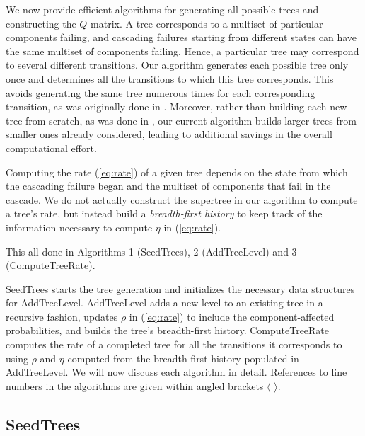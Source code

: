 \documentclass[12pt]{article}
\def\myxout{\bgroup \markoverwith{\textcolor{red}{\hbox to.35em{\hss/\hss}}}\ULon}
\newcommand{\deleted}[1]{}
\newcommand{\changed}[1]{#1}
\newcommand{\changed}[1]{\textcolor{red}{#1}}
\newcommand{\deleted}[1]{{\myxout{#1}}}
\newcommand{\varName}[1]{\textrm{\it#1}}
\newcommand{\citeLine}[1]{$\langle \, #1 \, \rangle$}
\begin{document}
We now provide efficient algorithms for generating all possible trees and constructing the $Q$-matrix. A tree corresponds to a multiset of particular components failing, and cascading failures starting from different states can have the same multiset of components failing. Hence, a particular tree may correspond to several different transitions. Our algorithm generates each possible tree only once and determines all the transitions to which this tree corresponds. This avoids generating the same tree numerous times for each corresponding transition, as was originally done in \cite{ING:2009}. Moreover, rather than building each new tree from scratch, as was done in \cite{ING:2009}, our current algorithm builds larger trees from smaller ones already considered, leading to additional savings in the overall computational effort.

Computing the rate 
\changed{(\ref{eq:rate})}
of a given tree depends on the state from which the cascading failure began and the multiset of components that fail in the cascade. We do not actually construct the supertree in our algorithm to compute a tree's rate, but instead build a \varName{breadth-first history} to keep track of the information necessary to compute $\eta$ \changed{in (\ref{eq:rate})}.
\deleted{We explain the process of starting a tree, building its breadth-first history and computing its rate in Algorithms 1 (SeedTrees), 2 (AddTreeLevel) and 3 (ComputeTreeRate), respectively.}
\changed{This all done in Algorithms 1 (SeedTrees), 2 (AddTreeLevel) and 3 (ComputeTreeRate).}

SeedTrees starts the tree generation and initializes the necessary data structures for AddTreeLevel. AddTreeLevel adds a new level to an existing tree in a recursive fashion, updates $\rho$
\changed{in (\ref{eq:rate})}
to include the
\changed{component-affected} probabilities, and builds the tree's breadth-first history. ComputeTreeRate computes the rate of a completed tree for all the transitions it corresponds to using $\rho$ and $\eta$ computed from the breadth-first history populated in AddTreeLevel. We will now discuss each algorithm in detail. References to line numbers in the algorithms are given within angled brackets \citeLine{}.



\subsection{SeedTrees}
\label{sec:seedtrees}
\end{document}
